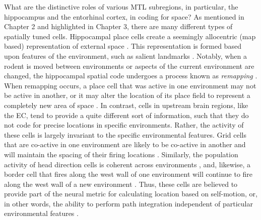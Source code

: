 What are the distinctive roles of various MTL subregions, in particular, the hippocampus and the entorhinal cortex, in coding for space? As mentioned in Chapter 2 and highlighted in Chapter 3, there are many different types of spatially tuned cells. Hippocampal place cells create a seemingly allocentric (map based) representation of external space \citep{OKeeDost71,Mull96}. This representation is formed based upon features of the environment, such as salient landmarks \citep{OKeeBurg96}. Notably, when a rodent is moved between environments or aspects of the current environment are changed, the hippocampal spatial code undergoes a process known as \textit{remapping} \citep{MullKubi87}. When remapping occurs, a place cell that was active in one environment may not be active in another, or it may alter the location of its place field to represent a completely new area of space \citep{MarkEtal95a,LeutEtal04a,LeutEtal05}. In contrast, cells in upstream brain regions, like the EC, tend to provide a quite different sort of information, such that they do not code for precise locations in specific environments. Rather, the activity of these cells is largely invariant to the specific environmental features. Grid cells that are co-active in one environment are likely to be co-active in another and will maintain the spacing of their firing locations \citep{FyhnEtal07}. Similarly, the population activity of head direction cells is coherent across environments \citep{TaubEtal90}, and, likewise, a border cell that fires along the west wall of one environment will continue to fire along the west wall of a new environment \citep{SolsEtal08}. Thus, these cells are believed to provide part of the neural metric for calculating location based on self-motion, or, in other words, the ability to perform path integration independent of particular environmental features \citep{JeffBurg06,BuzsMose13}.

